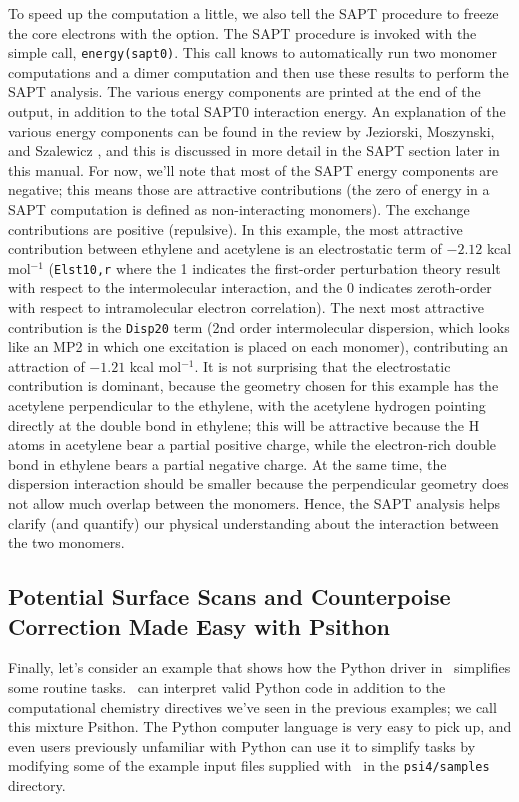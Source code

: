 To speed up the computation a little, we also tell the SAPT procedure to
freeze the core electrons with the  option.  The SAPT
procedure is invoked with the simple call, {\tt energy(\qq sapt0\qq)}.  This
call knows to automatically run two monomer computations and a dimer
computation and then use these results to perform the SAPT analysis.  The
various energy components are printed at the end of the output, in addition
to the total SAPT0 interaction energy.  An explanation of the various
energy components can be found in the review by Jeziorski, Moszynski, and
Szalewicz \cite{Jeziorski:1994:1887}, and this is discussed in more detail
in the SAPT section later in this manual.  For now, we'll note that most of
the SAPT energy components are negative; this means those are attractive
contributions (the zero of energy in a SAPT computation is defined as
non-interacting monomers).  The exchange contributions are positive
(repulsive).   In this example, the most attractive contribution between
ethylene and acetylene is an electrostatic term of $-2.12$ kcal mol$^{-1}$
({\tt Elst10,r} where the 1 indicates the first-order
perturbation theory result with respect to the intermolecular interaction,
and the 0 indicates zeroth-order with respect to intramolecular electron
correlation).  The next most attractive contribution is the {\tt Disp20}
term (2nd order intermolecular dispersion, which looks like an MP2 in which
one excitation is placed on each monomer), contributing an attraction of
$-1.21$ kcal mol$^{-1}$.  It is not surprising that the electrostatic
contribution is dominant, because the geometry chosen for this example has the
acetylene perpendicular to the ethylene, with the acetylene hydrogen
pointing directly at the double bond in ethylene; this will be attractive
because the H atoms in acetylene bear a partial positive charge, while the
electron-rich double bond in ethylene bears a partial negative charge.  At
the same time, the dispersion interaction should be smaller because the
perpendicular geometry does not allow much overlap between the monomers.
Hence, the SAPT analysis helps clarify (and quantify) our physical
understanding about the interaction between the two monomers. 

\subsection{Potential Surface Scans and Counterpoise Correction Made Easy
with Psithon}

Finally, let's consider an example that shows how the Python driver
in \PSIfour\ simplifies some routine tasks.  \PSIfour\ can interpret
valid Python code in addition to the computational chemistry directives
we've seen in the previous examples; we call this mixture Psithon.
The Python computer language is very easy to pick up, and even users
previously unfamiliar with Python can use it to simplify tasks by
modifying some of the example input files supplied with \PSIfour\
in the {\tt psi4/samples} directory.

